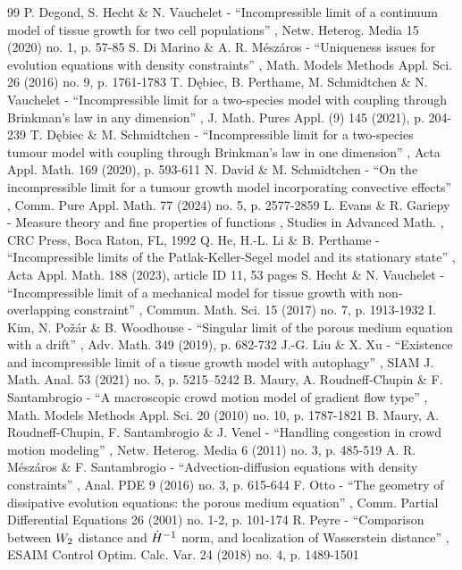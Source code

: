 \documentclass[11pt]{article}
\numberwithin{equation}{section}
\theoremstyle{plain}
\theoremstyle{remark}
\begin{document}
\begin{thebibliography}{99}
 P. Degond, S. Hecht \& N. Vauchelet - “Incompressible limit of a continuum model of tissue growth for two cell populations” , Netw. Heterog. Media 15 (2020) no. 1, p. 57-85
 S. Di Marino \& A. R. Mészáros - “Uniqueness issues for evolution equations with density constraints” , Math. Models Methods Appl. Sci. 26 (2016) no. 9, p. 1761-1783
 T. Dębiec, B. Perthame, M. Schmidtchen \& N. Vauchelet - “Incompressible limit for a two-species model with coupling through Brinkman’s law in any dimension” , J. Math. Pures Appl. (9) 145 (2021), p. 204-239
 T. Dębiec \& M. Schmidtchen - “Incompressible limit for a two-species tumour model with coupling through Brinkman’s law in one dimension” , Acta Appl. Math. 169 (2020), p. 593-611
 N. David \& M. Schmidtchen - “On the incompressible limit for a tumour growth model incorporating convective effects” , Comm. Pure Appl. Math. 77 (2024) no. 5, p. 2577-2859
 L. Evans \& R. Gariepy - Measure theory and fine properties of functions , Studies in Advanced Math. , CRC Press, Boca Raton, FL, 1992
 Q. He, H.-L. Li \& B. Perthame - “Incompressible limits of the Patlak-Keller-Segel model and its stationary state” , Acta Appl. Math. 188 (2023), article ID 11, 53 pages
 S. Hecht \& N. Vauchelet - “Incompressible limit of a mechanical model for tissue growth with non-overlapping constraint” , Commun. Math. Sci. 15 (2017) no. 7, p. 1913-1932
 I. Kim, N. Požár \& B. Woodhouse - “Singular limit of the porous medium equation with a drift” , Adv. Math. 349 (2019), p. 682-732
 J.-G. Liu \& X. Xu - “Existence and incompressible limit of a tissue growth model with autophagy” , SIAM J. Math. Anal. 53 (2021) no. 5, p. 5215–5242
 B. Maury, A. Roudneff-Chupin \& F. Santambrogio - “A macroscopic crowd motion model of gradient flow type” , Math. Models Methods Appl. Sci. 20 (2010) no. 10, p. 1787-1821
 B. Maury, A. Roudneff-Chupin, F. Santambrogio \& J. Venel - “Handling congestion in crowd motion modeling” , Netw. Heterog. Media 6 (2011) no. 3, p. 485-519
 A. R. Mészáros \& F. Santambrogio - “Advection-diffusion equations with density constraints” , Anal. PDE 9 (2016) no. 3, p. 615-644
 F. Otto - “The geometry of dissipative evolution equations: the porous medium equation” , Comm. Partial Differential Equations 26 (2001) no. 1-2, p. 101-174
 R. Peyre - “Comparison between $\rm W_2$ distance and $\dot{\rm H}^{-1}$ norm, and localization of Wasserstein distance” , ESAIM Control Optim. Calc. Var. 24 (2018) no. 4, p. 1489-1501

\end{thebibliography}
\end{document}
